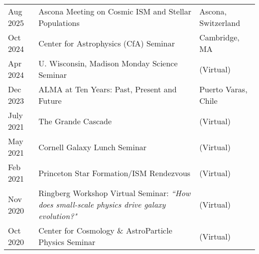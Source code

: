 \documentclass[11pt]{article}
\begin{document}
\begin{longtable}{p{} p{}p{}}



Aug 2025 & Ascona Meeting on Cosmic ISM and Stellar Populations & {\small Ascona, Switzerland}\\

Oct 2024 & Center for Astrophysics (CfA) Seminar & {\small Cambridge, MA}\\

Apr 2024 & U. Wisconsin, Madison Monday Science Seminar & {\small (Virtual)}\\
 
Dec 2023 & ALMA at Ten Years: Past, Present and Future & {\small Puerto Varas, Chile}\\

July 2021 & The Grande Cascade & {\small (Virtual)}\\

 May 2021 & Cornell Galaxy Lunch Seminar & {\small (Virtual)}\\

 Feb 2021 & Princeton Star Formation/ISM Rendezvous &{\small (Virtual)} \\

 Nov 2020 & Ringberg Workshop Virtual Seminar: {\em ``How does small-scale physics drive galaxy evolution?"}  & {\small (Virtual)}\\

 Oct 2020 & Center for Cosmology \& AstroParticle Physics Seminar & {\small (Virtual)}\\

\end{longtable}
\vspace{-12pt}
\end{document}
